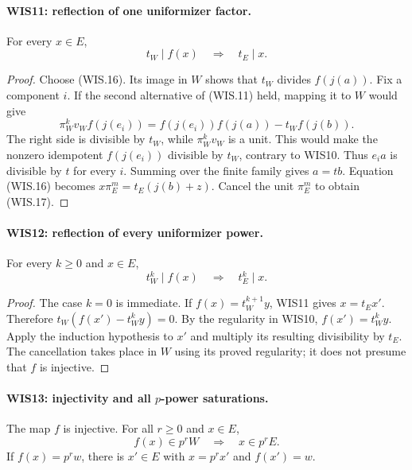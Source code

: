\paragraph{WIS11: reflection of one uniformizer factor.}
\label{claim:WIS11}
For every $x\in E$,
\[
                         t_W\mid f(x)
                    \quad\Longrightarrow\quad t_E\mid x. \tag{WIS.17}
\]

\begin{proof}
Choose (WIS.16). Its image in $W$ shows that $t_W$
divides $f(j(a))$. Fix a component $i$. If the second
alternative of (WIS.11) held, mapping it to $W$ would give
\[
       \pi_W^kv_W f(j(e_i))
          =f(j(e_i))f(j(a))-t_Wf(j(b)).
\]
The right side is divisible by $t_W$, while
$\pi_W^kv_W$ is a unit. This would make the nonzero
idempotent $f(j(e_i))$ divisible by $t_W$, contrary
to WIS10. Thus $e_i a$ is divisible by $t$ for every $i$.
Summing over the finite family gives $a=tb$. Equation
(WIS.16) becomes $x\pi_E^m=t_E(j(b)+z)$.
Cancel the unit $\pi_E^m$ to obtain (WIS.17).
\end{proof}

\paragraph{WIS12: reflection of every uniformizer power.}
\label{claim:WIS12}
For every $k\geq0$ and $x\in E$,
\[
                      t_W^k\mid f(x)
                 \quad\Longrightarrow\quad t_E^k\mid x.   \tag{WIS.18}
\]

\begin{proof}
The case $k=0$ is immediate. If
$f(x)=t_W^{k+1}y$, WIS11 gives $x=t_Ex'$.
Therefore
$t_W(f(x')-t_W^ky)=0$. By the regularity in WIS10,
$f(x')=t_W^ky$. Apply the induction hypothesis to $x'$
and multiply its resulting divisibility by $t_E$.
The cancellation takes place in $W$ using its proved
regularity; it does not presume that $f$ is injective.
\end{proof}

\paragraph{WIS13: injectivity and all $p$-power saturations.}
\label{claim:WIS13}
The map $f$ is injective. For all $r\geq0$ and $x\in E$,
\[
 f(x)\in p^rW\quad\Longrightarrow\quad x\in p^rE.
                                                               \tag{WIS.19}
\]
If $f(x)=p^rw$, there is $x'\in E$ with
$x=p^rx'$ and $f(x')=w$.

